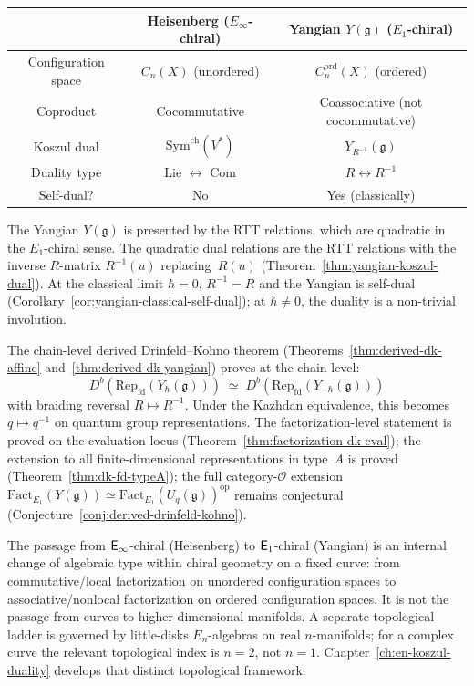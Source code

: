 \begin{center}
\small
\begin{tabular}{c|c|c}
& \textbf{Heisenberg}
  ($E_\infty$-chiral) &
\textbf{Yangian} $Y(\mathfrak{g})$
  ($E_1$-chiral) \\
\hline
Configuration space & $C_n(X)$ (unordered)
  & $C_n^{\mathrm{ord}}(X)$ (ordered) \\
Coproduct & Cocommutative
  & Coassociative (not cocommutative) \\
Koszul dual & $\mathrm{Sym}^{\mathrm{ch}}(V^*)$
  & $Y_{R^{-1}}(\mathfrak{g})$ \\
Duality type & Lie $\leftrightarrow$ Com
  & $R \leftrightarrow R^{-1}$ \\
Self-dual? & No & Yes (classically)
\end{tabular}
\end{center}

The Yangian $Y(\mathfrak{g})$ is presented by the RTT relations,
which are quadratic in the $E_1$-chiral sense.  The quadratic
dual relations are the RTT relations with the inverse $R$-matrix
$R^{-1}(u)$ replacing~$R(u)$
(Theorem~\ref{thm:yangian-koszul-dual}).  At the classical limit
$\hbar = 0$, $R^{-1} = R$ and the Yangian is self-dual
(Corollary~\ref{cor:yangian-classical-self-dual}); at $\hbar \neq 0$,
the duality is a non-trivial involution.

The chain-level derived Drinfeld--Kohno theorem
(Theorems~\ref{thm:derived-dk-affine}
and~\ref{thm:derived-dk-yangian}) proves at the chain level:
\begin{equation}\label{eq:frame-derived-dk}
D^b(\mathrm{Rep}_{\mathrm{fd}}(Y_\hbar(\mathfrak{g})))
\;\simeq\;
D^b(\mathrm{Rep}_{\mathrm{fd}}(Y_{-\hbar}(\mathfrak{g})))
\end{equation}
with braiding reversal $R \mapsto R^{-1}$.  Under the Kazhdan
equivalence, this becomes $q \mapsto q^{-1}$ on quantum group
representations.  The factorization-level statement is proved on
the evaluation locus (Theorem~\ref{thm:factorization-dk-eval});
the extension to all finite-dimensional representations in type~$A$
is proved (Theorem~\ref{thm:dk-fd-typeA}); the full
category-$\mathcal{O}$ extension
$\mathrm{Fact}_{E_1}(Y(\mathfrak{g}))
\simeq \mathrm{Fact}_{E_1}(U_q(\mathfrak{g}))^{\mathrm{op}}$
remains conjectural (Conjecture~\ref{conj:derived-drinfeld-kohno}).

The passage from $\mathsf{E}_{\infty}$-chiral (Heisenberg) to $\mathsf{E}_1$-chiral
(Yangian) is an internal change of algebraic type within chiral
geometry on a fixed curve: from commutative/local factorization on
unordered configuration spaces to associative/nonlocal factorization on
ordered configuration spaces.  It is not the passage from curves to
higher-dimensional manifolds.  A separate topological ladder is
governed by little-disks $E_n$-algebras on real $n$-manifolds; for a
complex curve the relevant topological index is $n = 2$, not $n = 1$.
Chapter~\ref{ch:en-koszul-duality} develops that distinct topological
framework.

